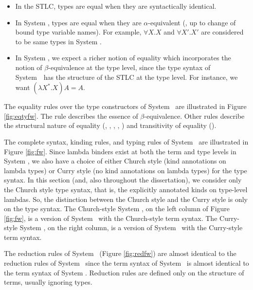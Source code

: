 \begin{itemize}
\item In the STLC, types are equal when they are syntactically identical.
\item In System \F, types are equal when they are $\alpha$-equivalent
(\ie, up to change of bound type variable names). For example,
$\forall X.X$ and $\forall X'.X'$ are considered to be same types in System \F.

\item
In System \Fw, we expect a richer notion of equality which incorporates
the notion of $\beta$-equivalence at the type level, since the type syntax of
System~\Fw\ has the structure of the STLC at the type level.
For instance, we want $(\lambda X^{*}.X) A = A$. 
\end{itemize}

The equality rules over the type constructors of System \Fw\ are
illustrated in Figure \ref{fig:eqtyfw}. The  rule
describes the essence of $\beta$-equivalence.
Other rules describe the structural nature of equality (,
, , , )
and transitivity of equality ().


The complete syntax, kinding rules, and typing rules of System \Fw\
are illustrated in Figure \ref{fig:fw}. Since lambda binders exist
at both the term and type levels in System \Fw, we also have a choice of
either Church style (kind annotations on lambda types) or
Curry style (no kind annotations on lambda types) for the type syntax.
In this section (and, also throughout the dissertation), we consider
only the Church style type syntax, that is, the explicitly annotated kinds
on type-level lambdas. So, the distinction between the Church style and
the Curry style is only on the type syntax. The Church-style System \Fw,
on the left column of Figure \ref{fig:fw}, is a version of System \Fw\ with
the Church-style term syntax. The Curry-style System \Fw, on the right column,
is a version of System \Fw\ with the Curry-style term syntax.

The reduction rules of System \Fw\ (Figure \ref{fig:redfw}) are almost identical
to the reduction rules of System \F\ since the term syntax of System \Fw\ is
almost identical to the term syntax of System \F. Reduction rules are defined
only on the structure of terms, usually ignoring types.

